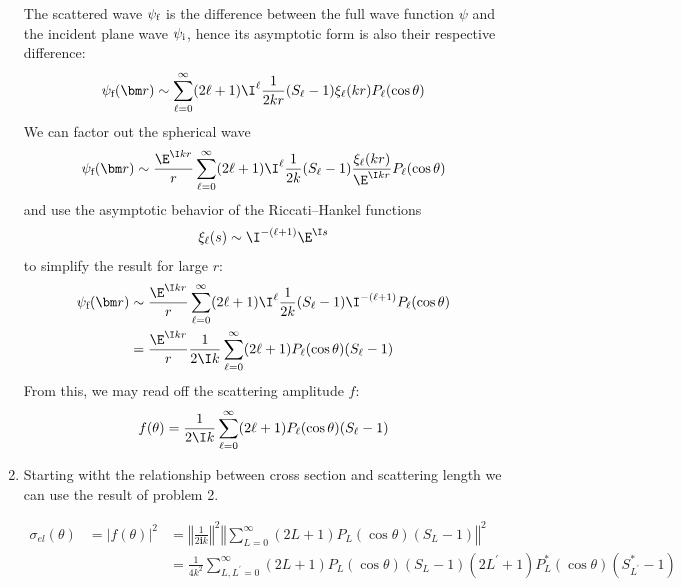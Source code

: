 \documentclass[fleqn, 12pt]{article}
\begin{document}
\begin{enumerate}
  The scattered wave $\psi_{\text f}$ is the difference between the full wave
  function $\psi$ and the incident plane wave $\psi_{\text i}$, hence its
  asymptotic form is also their respective difference:
  \begin{align*}
    \psi_{\text f}(\bm r) \sim \sum_{\ell = 0}^\infty (2 \ell + 1) \I^\ell
    \frac{1}{2 k r} (S_\ell - 1) \xi_\ell(k r) P_\ell(\cos \theta)
  \end{align*}
  We can factor out the spherical wave
  \begin{align*}
    \psi_{\text f}(\bm r) \sim \frac{\E^{\I k r}}{r}
    \sum_{\ell = 0}^\infty (2 \ell + 1) \I^\ell
    \frac{1}{2 k} (S_\ell - 1) \frac{\xi_\ell(k r)}{\E^{\I k r}} P_\ell(\cos \theta)
  \end{align*}
  and use the asymptotic behavior of the Riccati--Hankel functions
  \begin{align*}
    \xi_\ell(s) \sim \I^{-(\ell + 1)} \E^{\I s}
  \end{align*}
  to simplify the result for large $r$:
  \begin{align*}
    \psi_{\text f}(\bm r)
    &\sim \frac{\E^{\I k r}}{r}
    \sum_{\ell = 0}^\infty (2 \ell + 1) \I^\ell
    \frac{1}{2 k} (S_\ell - 1) \I^{-(\ell + 1)} P_\ell(\cos \theta) \\
    &=\frac{\E^{\I k r}}{r}
    \frac{1}{2 \I k} \sum_{\ell = 0}^\infty (2 \ell + 1)
    P_\ell(\cos \theta) (S_\ell - 1)
  \end{align*}
  From this, we may read off the scattering amplitude $f$:
  \begin{align*}
    f(\theta) =
    \frac{1}{2 \I k} \sum_{\ell = 0}^\infty (2 \ell + 1)
    P_\ell(\cos \theta) (S_\ell - 1)
  \end{align*}

\item Starting witht the relationship between cross section and scattering
length we can use the result of problem 2.

\begin{eqnarray*}
\sigma_{el}\left(\theta\right) & =|f(\theta)|^{2} & =\left\Vert \frac{1}{2\boldsymbol{i}k}\right\Vert ^{2}\left\Vert \sum_{L=0}^{\infty}\left(2L+1\right)P_{L}\left(\cos\theta\right)\left(S_{L}-1\right)\right\Vert ^{2}\\
 &  & {\displaystyle =\frac{1}{4k^{2}}\sum_{L,L^{\prime}=0}^{\infty}\left(2L+1\right)P_{L}\left(\cos\theta\right)\left(S_{L}-1\right)\left(2L^{\prime}+1\right)P_{L}^{*}\left(\cos\theta\right)\left(S_{L^{\prime}}^{*}-1\right)}
\end{eqnarray*}



\end{enumerate}
\end{document}
